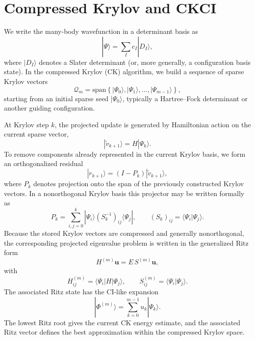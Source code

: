 \section{Compressed Krylov and CKCI}
\label{sec:ck-ckci}

We write the many-body wavefunction in a determinant basis as
\begin{equation}
|\Psi\rangle = \sum_I c_I |D_I\rangle,
\end{equation}
where $|D_I\rangle$ denotes a Slater determinant (or, more generally, a
configuration basis state). In the compressed Krylov (CK) algorithm, we build a
sequence of sparse Krylov vectors
\begin{equation}
\mathcal{Q}_m = \mathrm{span}\left\{ |\Psi_0\rangle, |\Psi_1\rangle, \dots, |\Psi_{m-1}\rangle \right\},
\end{equation}
starting from an initial sparse seed $|\Psi_0\rangle$, typically a
Hartree--Fock determinant or another guiding configuration.

At Krylov step $k$, the projected update is generated by Hamiltonian action on
the current sparse vector,
\begin{equation}
|\widetilde{v}_{k+1}\rangle = H |\Psi_k\rangle.
\end{equation}
To remove components already represented in the current Krylov basis, we form
an orthogonalized residual
\begin{equation}
|r_{k+1}\rangle = \left( I - P_k \right)|\widetilde{v}_{k+1}\rangle,
\end{equation}
where $P_k$ denotes projection onto the span of the previously constructed
Krylov vectors. In a nonorthogonal Krylov basis this projector may be written
formally as
\begin{equation}
P_k = \sum_{i,j=0}^{k} |\Psi_i\rangle (S_k^{-1})_{ij} \langle \Psi_j |,
\qquad
(S_k)_{ij} = \langle \Psi_i | \Psi_j \rangle.
\end{equation}
Because the stored Krylov vectors are compressed and generally nonorthogonal,
the corresponding projected eigenvalue problem is written in the generalized
Ritz form
\begin{equation}
H^{(m)} \mathbf{u} = E\, S^{(m)} \mathbf{u},
\end{equation}
with
\begin{equation}
H^{(m)}_{ij} = \langle \Psi_i | H | \Psi_j \rangle,
\qquad
S^{(m)}_{ij} = \langle \Psi_i | \Psi_j \rangle.
\end{equation}
The associated Ritz state has the CI-like expansion
\begin{equation}
|\Phi^{(m)}\rangle = \sum_{k=0}^{m-1} u_k |\Psi_k\rangle.
\end{equation}
The lowest Ritz root gives the current CK energy estimate, and the associated
Ritz vector defines the best approximation within the compressed Krylov space.

